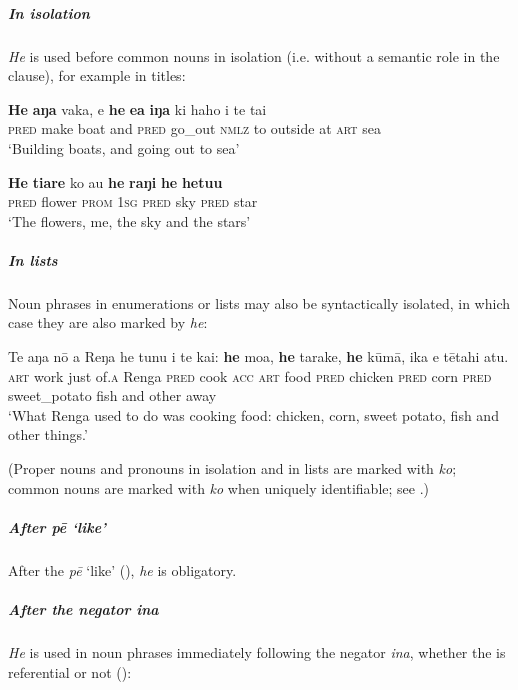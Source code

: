 \subparagraph{In isolation} \textit{He} is used before common nouns in isolation (i.e. without a semantic role in the clause), for example in titles:

\ea\label{ex:5.45}
\gll \textbf{He} \textbf{aŋa} vaka, {\ꞌ}e \textbf{he} \textbf{e{\ꞌ}a} \textbf{iŋa} ki haho i te tai \\
\textsc{pred} make boat and \textsc{pred} go\_out \textsc{nmlz} to outside at \textsc{art} sea \\

\glt 
‘Building boats, and going out to sea’ \textstyleExampleref{[R200 title]}
\z

\ea\label{ex:5.46}
\gll \textbf{He} \textbf{tiare} ko au \textbf{he} \textbf{raŋi} \textbf{he} \textbf{hetu{\ꞌ}u} \\
\textsc{pred} flower \textsc{prom} \textsc{1sg} \textsc{pred} sky \textsc{pred} star \\

\glt 
‘The flowers, me, the sky and the stars’ \textstyleExampleref{[R222 title]}
\z

\subparagraph{In lists} Noun phrases in enumerations or lists may also be syntactically isolated, in which case they are also marked by \textit{he}:

\ea\label{ex:5.47}
\gll Te aŋa nō {\ꞌ}a Reŋa he tunu i te kai: \textbf{he} moa, \textbf{he} tarake,  \textbf{he} kūmā, ika {\ꞌ}e tētahi atu.\\
\textsc{art} work just of\textsc{.a} Renga \textsc{pred} cook \textsc{acc} \textsc{art} food \textsc{pred} chicken \textsc{pred} corn  \textsc{pred} sweet\_potato fish and other away\\

\glt
‘What Renga used to do was cooking food: chicken, corn, sweet potato, fish and other things.’ \textstyleExampleref{[R363.119]} 
\z

(Proper nouns and pronouns in isolation and in lists are marked with \textit{ko}; common nouns are marked with \textit{ko} when uniquely identifiable; see .)

\subparagraph{After \textit{pē} ‘like’} After the  \textit{pē} ‘like’ (), \textit{he} is obligatory.

\subparagraph{After the negator \textit{{\ꞌ}ina}} \textit{He} is used in noun phrases immediately following the negator \textit{{\ꞌ}ina}, whether the  is referential or not ():

